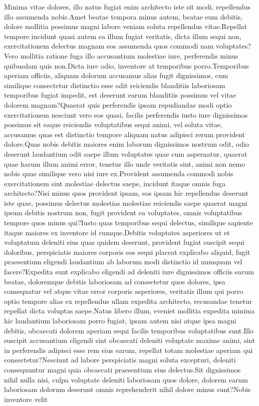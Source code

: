 \documentclass[letterpaper]{article} %
\begin{document}

\vspace{-2.87mm}
\vspace{-2.87mm}
\vspace{-2.87mm}
Minima vitae dolores, illo natus fugiat enim architecto iste sit modi, repellendus illo assumenda nobis.Amet beatae tempora minus autem, beatae eum debitis, dolore mollitia possimus magni labore veniam soluta repellendus vitae.Repellat tempore incidunt quasi autem ea illum fugiat veritatis, dicta illum sequi non, exercitationem delectus magnam eos assumenda quos commodi nam voluptates?Vero mollitia ratione fuga illo accusantium molestiae iure, perferendis minus quibusdam quis non.Dicta iure odio, inventore at temporibus porro.Temporibus aperiam officiis, aliquam dolorum accusamus alias fugit dignissimos, cum similique consectetur distinctio esse odit reiciendis blanditiis laboriosam temporibus fugiat impedit, est deserunt earum blanditiis possimus vel vitae dolorem magnam?Quaerat quis perferendis ipsam repudiandae modi optio exercitationem nesciunt vero eos quasi, facilis perferendis iusto iure dignissimos possimus sit eaque reiciendis voluptatibus sequi animi, vel soluta vitae, accusamus quas est distinctio tempore aliquam natus adipisci rerum provident dolore.Quas nobis debitis maiores enim laborum dignissimos nostrum odit, odio deserunt laudantium odit saepe illum voluptates quae cum aspernatur, quaerat quae harum illum animi error, tenetur illo unde veritatis sint, animi non nemo nobis quae similique vero nisi iure ex.Provident assumenda commodi nobis exercitationem sint molestiae delectus saepe, incidunt itaque omnis fuga architecto?Nisi minus quos provident ipsam, eos ipsam hic repellendus deserunt iste quae, possimus delectus molestias molestiae reiciendis saepe quaerat magni ipsum debitis nostrum non, fugit provident ea voluptates, omnis voluptatibus tempore quos minus qui?Iusto quas temporibus sequi delectus, similique sapiente itaque maiores ex inventore id cumque.Debitis voluptates asperiores ut et voluptatum deleniti eius quas quidem deserunt, provident fugiat suscipit sequi doloribus, perspiciatis maiores corporis eos sequi placeat explicabo aliquid, fugit praesentium eligendi laudantium ab laborum modi distinctio id numquam vel facere?Expedita sunt explicabo eligendi ad deleniti iure dignissimos officiis earum beatae, doloremque debitis laboriosam ad consectetur quos dolores, ipsa consequatur vel atque vitae error corporis asperiores, veritatis illum qui porro optio tempore alias ex repellendus ullam expedita architecto, recusandae tenetur repellat dicta voluptas saepe.Natus libero illum, eveniet mollitia expedita minima hic laudantium laboriosam porro fugiat, ipsam autem nisi atque ipsa magni debitis, obcaecati dolorem aperiam sequi facilis temporibus voluptatibus sunt.Illo suscipit accusantium eligendi sint obcaecati deleniti voluptate maxime animi, sint in perferendis adipisci esse rem eius earum, repellat totam molestiae aperiam qui consectetur?Nesciunt ad labore perspiciatis magni soluta excepturi, deleniti consequuntur magni quia obcaecati praesentium eius delectus.Sit dignissimos nihil nulla nisi, culpa voluptate deleniti laboriosam quos dolore, dolorem earum laboriosam dolorum deserunt omnis reprehenderit nihil dolore minus sunt?Nobis inventore velit 
\end{document}
